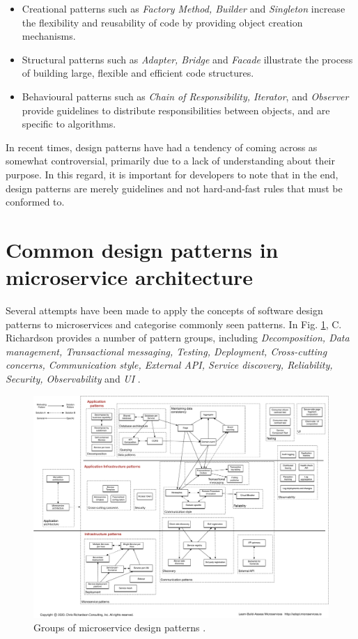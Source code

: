 \begin{itemize}
  \item Creational patterns such as \textit{Factory Method, Builder} and \textit{Singleton} increase the flexibility
        and reusability of code by providing object creation mechanisms.
  \item Structural patterns such as \textit{Adapter, Bridge} and \textit{Facade} illustrate the process of building
        large, flexible and efficient code structures.
  \item Behavioural patterns such as \textit{Chain of Responsibility, Iterator}, and \textit{Observer} provide
        guidelines to distribute responsibilities between objects, and are specific to algorithms.
\end{itemize}

In recent times, design patterns have had a tendency of coming across as somewhat controversial, primarily due to a
lack of understanding about their purpose. In this regard, it is important for developers to note that in the end,
design patterns are merely guidelines and not hard-and-fast rules that must be conformed to.

\section{Common design patterns in microservice architecture}

Several attempts have been made to  apply the concepts of software design patterns to microservices and categorise
commonly seen patterns. In Fig. \ref{fig:richardson-patterns}, C. Richardson provides a number of pattern groups,
including \textit{Decomposition, Data management, Transactional messaging, Testing, Deployment, Cross-cutting
  concerns, Communication style, External API, Service discovery, Reliability, Security, Observability} and
\textit{UI} \cite{richardson-patterns}.

\begin{figure}[h]
  \centering
  \includegraphics[width=1.0\linewidth]{./assets/images/related-work/richardson-patterns.pdf}
  \caption{Groups of microservice design patterns \cite{richardson-patterns}.}
  \label{fig:richardson-patterns}
\end{figure}

